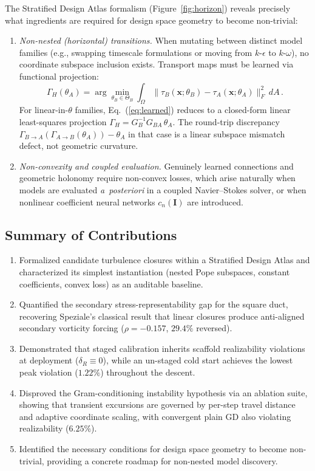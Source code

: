 \documentclass[preprint,aps,prb,longbibliography,superscriptaddress]{revtex4-2}
\newcommand{\bx}{\mathbf{x}}
\newcommand{\bI}{\mathbf{I}}
\begin{document}
The Stratified Design Atlas formalism (Figure~\ref{fig:horizon}) reveals
precisely what ingredients are required for design space geometry to become
non-trivial:
\begin{enumerate}
  \item \textit{Non-nested (horizontal) transitions.} When mutating between
    distinct model families (e.g., swapping timescale formulations or moving
    from $k$-$\epsilon$ to $k$-$\omega$), no coordinate subspace inclusion
    exists. Transport maps must be learned via functional projection:
    \begin{equation}\label{eq:learned}
      \Gamma_H(\theta_A) = \arg\min_{\theta_B \in \Theta_B}
      \int_\Omega \|\tau_B(\bx;\theta_B) - \tau_A(\bx;\theta_A)\|_F^2\, dA\,.
    \end{equation}
    For linear-in-$\theta$ families, Eq.~(\ref{eq:learned}) reduces to a
    closed-form linear least-squares projection
    $\Gamma_H = G_B^{-1} G_{BA}\, \theta_A$. The round-trip discrepancy
    $\Gamma_{B \to A}(\Gamma_{A \to B}(\theta_A)) - \theta_A$ in that case is
    a linear subspace mismatch defect, not geometric curvature.
  \item \textit{Non-convexity and coupled evaluation.} Genuinely learned
    connections and geometric holonomy require non-convex losses, which arise
    naturally when models are evaluated \emph{a~posteriori} in a coupled
    Navier--Stokes solver, or when nonlinear coefficient neural networks
    $c_n(\bI)$ are introduced.
\end{enumerate}

\subsection{Summary of Contributions}\label{sec:contributions}

\begin{enumerate}
  \item Formalized candidate turbulence closures within a Stratified Design
    Atlas and characterized its simplest instantiation (nested Pope subspaces,
    constant coefficients, convex loss) as an auditable baseline.
  \item Quantified the secondary stress-representability gap for the square
    duct, recovering Speziale's classical result that linear closures produce
    anti-aligned secondary vorticity forcing ($\rho = -0.157$, $29.4\%$ reversed).
  \item Demonstrated that staged calibration inherits scaffold realizability
    violations at deployment ($\delta_R \equiv 0$), while an un-staged cold start
    achieves the lowest peak violation ($1.22\%$) throughout the descent.
  \item Disproved the Gram-conditioning instability hypothesis via an ablation
    suite, showing that transient excursions are governed by per-step travel
    distance and adaptive coordinate scaling, with convergent plain GD also
    violating realizability ($6.25\%$).
  \item Identified the necessary conditions for design space geometry to become
    non-trivial, providing a concrete roadmap for non-nested model discovery.
\end{enumerate}
\end{document}
